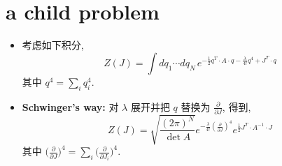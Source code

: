 \section{a child problem}
\begin{itemize}
	\item 考虑如下积分,
	\begin{equation}
		Z(J) = \int dq_1 \cdots dq_N \, e^{- \frac{1}{2} q^T \cdot A \cdot q - \frac{\lambda}{4!} q^4 + J^T \cdot q}
	\end{equation}
	其中 $q^4 = \sum_i q_i^4$.
	
	\item \textbf{Schwinger's way:} 对 $\lambda$ 展开并把 $q$ 替换为 $\frac{\partial}{\partial J}$, 得到,
	\begin{equation}
		Z(J) = \sqrt{\frac{(2 \pi)^N}{\det A}} e^{- \frac{\lambda}{4!} (\frac{\partial}{\partial J})^4} e^{\frac{1}{2} J^T \cdot A^{- 1} \cdot J}
	\end{equation}
	其中 $\big( \frac{\partial}{\partial J} \big)^4 = \sum_i \big( \frac{\partial}{\partial J_i} \big)^4$.
\end{itemize}

